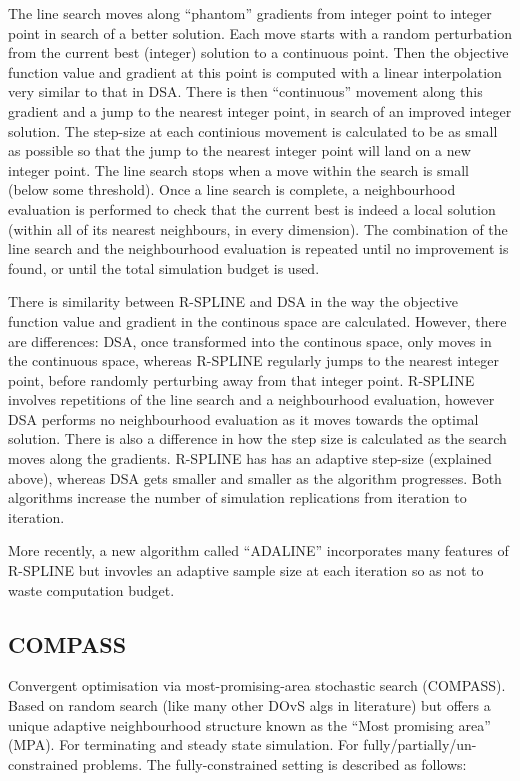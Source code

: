 \documentclass{article}
\begin{document}
The line search moves along ``phantom'' gradients from integer point to integer point in search of a better solution. Each move starts with a random perturbation from the current best (integer) solution to a continuous point. Then the objective function value and gradient at this point is computed with a linear interpolation very similar to that in DSA. There is then ``continuous'' movement along this gradient and a jump to the nearest integer point, in search of an improved integer solution. The step-size at each continious movement is calculated to be as small as possible so that the jump to the nearest integer point will land on a new integer point. The line search stops when a move within the search is small (below some threshold). Once a line search is complete, a neighbourhood evaluation is performed to check that the current best is indeed a local solution (within all of its nearest neighbours, in every dimension). The combination of the line search and the neighbourhood evaluation is repeated until no improvement is found, or until the total simulation budget is used. \newline

There is similarity between R-SPLINE and DSA in the way the objective function value and gradient in the continous space are calculated. However, there are differences: DSA, once transformed into the continous space, only moves in the continuous space, whereas R-SPLINE regularly jumps to the nearest integer point, before randomly perturbing away from that integer point. R-SPLINE involves repetitions of the line search and a neighbourhood evaluation, however DSA performs no neighbourhood evaluation as it moves towards the optimal solution. There is also a difference in how the step size is calculated as the search moves along the gradients. R-SPLINE has has an adaptive step-size (explained above), whereas DSA gets smaller and smaller as the algorithm progresses. Both algorithms increase the number of simulation replications from iteration to iteration. \newline

More recently, a new algorithm called ``ADALINE'' incorporates many features of R-SPLINE but invovles an adaptive sample size at each iteration so as not to waste computation budget. 

\subsection{COMPASS}


Convergent optimisation via most-promising-area stochastic search (COMPASS). Based on random search (like many other DOvS algs in literature) but offers a unique adaptive neighbourhood structure known as the ``Most promising area'' (MPA). For terminating and steady state simulation. For fully/partially/un- constrained problems. The fully-constrained setting is described as follows: \newline
\end{document}
